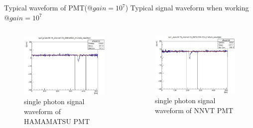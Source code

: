 \begin{frame}{Typical waveform of PMT(@$gain=10^7$)}
Typical signal waveform when working @$gain=10^7$
\begin{columns}
\begin{column}{.485\textwidth}
\begin{figure}
\centering
\includegraphics[width=\textwidth]{figures/hamwave.png} %
\caption{single photon signal waveform of HAMAMATSU PMT}
\end{figure}
\end{column}
\begin{column}{.5\textwidth}
\begin{figure}
\centering
\includegraphics[width=\textwidth]{figures/mcpwave.png} %
\caption{single photon signal waveform of NNVT PMT}
\end{figure}
\end{column}
\end{columns}
\end{frame}
